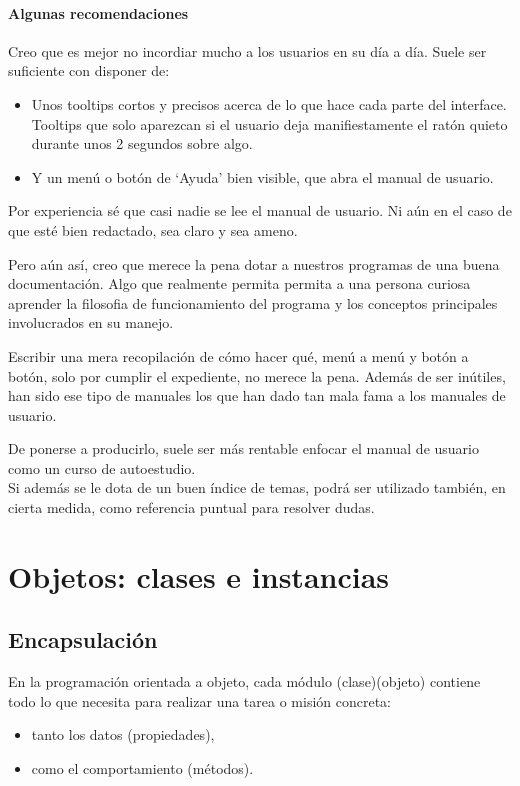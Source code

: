 \documentclass[spanish,12pt,a4paper,final,oneside]{book}
\begin{document}
\subsubsection*{Algunas recomendaciones}
Creo que es mejor no incordiar mucho a los usuarios en su día a día. Suele ser suficiente con disponer de:
\begin{itemize}
\item Unos tooltips cortos y precisos acerca de lo que hace cada parte del interface. Tooltips que solo aparezcan si el usuario deja manifiestamente el ratón quieto durante unos 2 segundos sobre algo. 
\item Y un menú o botón de `Ayuda' bien visible, que abra el manual de usuario.
\end{itemize}

Por experiencia sé que casi nadie se lee el manual de usuario. Ni aún en el caso de que esté bien redactado, sea claro y sea ameno.

Pero aún así, creo que merece la pena dotar a nuestros programas de una buena documentación. Algo que realmente permita permita a una persona curiosa aprender la filosofia de funcionamiento del programa y los conceptos principales involucrados en su manejo.

Escribir una mera recopilación de cómo hacer qué, menú a menú y botón a botón, solo por cumplir el expediente, no merece la pena. Además de ser inútiles, han sido ese tipo de manuales los que han dado tan mala fama a los manuales de usuario.

De ponerse a producirlo, suele ser más rentable enfocar el manual de usuario como un curso de autoestudio.
\\Si además se le dota de un buen índice de temas, podrá ser utilizado también, en cierta medida, como referencia puntual para resolver dudas.






\chapter{Objetos: clases e instancias}

\section{Encapsulación}
En la programación orientada a objeto, cada módulo (clase)(objeto) contiene todo lo que necesita para realizar una tarea o misión concreta: 
\begin{itemize}
\item tanto los datos (propiedades),
\item como el comportamiento (métodos).
\end{itemize}
\end{document}
